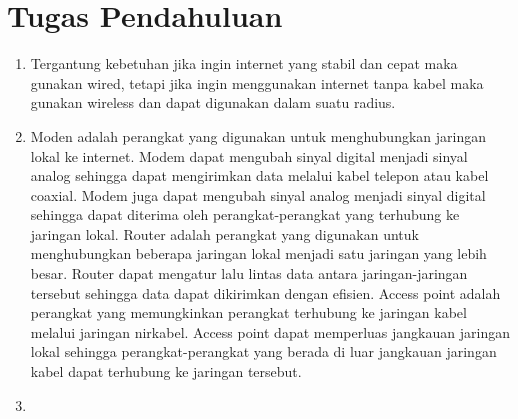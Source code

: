 \section{Tugas Pendahuluan}
\begin{enumerate}
	\item Tergantung kebetuhan jika ingin internet yang stabil dan cepat maka gunakan wired, tetapi jika ingin 
		menggunakan internet tanpa kabel maka gunakan wireless dan dapat digunakan dalam suatu radius.
	\item Moden adalah perangkat yang digunakan untuk menghubungkan jaringan lokal ke internet. Modem dapat mengubah sinyal digital
	menjadi sinyal analog sehingga dapat mengirimkan data melalui kabel telepon atau kabel coaxial. Modem juga dapat mengubah sinyal analog menjadi sinyal digital sehingga dapat diterima oleh perangkat-perangkat yang terhubung ke jaringan lokal.
	Router adalah perangkat yang digunakan untuk menghubungkan beberapa jaringan lokal menjadi satu jaringan yang lebih besar. Router dapat mengatur lalu lintas data antara jaringan-jaringan tersebut sehingga data dapat dikirimkan dengan efisien.
	Access point adalah perangkat yang memungkinkan perangkat terhubung ke jaringan kabel melalui jaringan nirkabel. Access point dapat memperluas jangkauan jaringan lokal sehingga perangkat-perangkat yang berada di luar jangkauan jaringan kabel dapat terhubung ke jaringan tersebut.
	\item 
\end{enumerate}